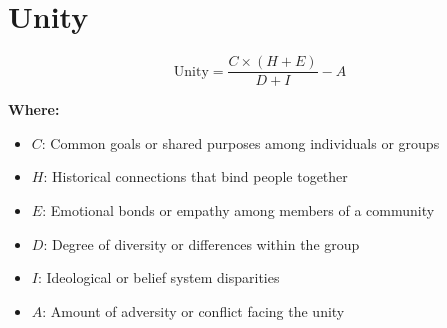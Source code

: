 \chapter{Unity}

\begin{equation}
\text{Unity} = \frac{C \times (H + E)}{D + I} - A
\end{equation}

\textbf{Where:}

\begin{itemize}
    \item $C$: Common goals or shared purposes among individuals or groups
    \item $H$: Historical connections that bind people together
    \item $E$: Emotional bonds or empathy among members of a community
    \item $D$: Degree of diversity or differences within the group
    \item $I$: Ideological or belief system disparities
    \item $A$: Amount of adversity or conflict facing the unity
\end{itemize}
